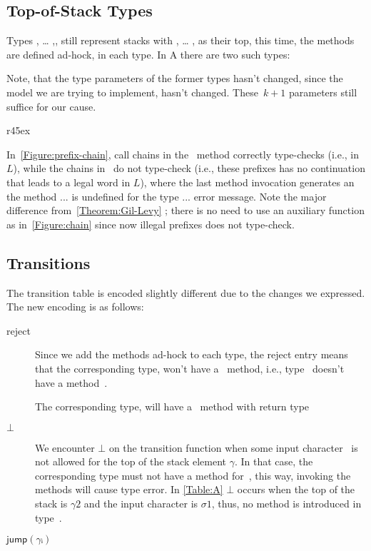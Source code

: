 \subsection{Top-of-Stack Types}
Types , … ,, still represent stacks
  with , … , as their top,
  this time, the methods are defined ad-hock, in each type.
In A there are two such types:

\begin{quote}
\end{quote}

Note, that the type parameters of the former types hasn't changed,
  since the model we are trying to implement, hasn't changed.
  These~$k+1$ parameters still suffice for our cause.

\begin{wrapfigure}[14]r{45ex}
  \caption{\label{Figure:prefix-chain} Accepting and non-accepting call chains with the
  type encoding of jDPDA~$A$ (as defined in \cref{Table:A}), such that 
  illegal prefixes won't compile}
\end{wrapfigure}

In~\cref{Figure:prefix-chain}, call chains in the~ method 
  correctly type-checks (i.e., in $L$), while the chains in~ 
  do not type-check (i.e., these prefixes has no continuation that leads to a legal word in $L$), 
  where the last method invocation generates an \textsf{the method ... is undefined for the type ...}
  error message.
Note the major difference from~\cref{Theorem:Gil-Levy} ; there is no need to
  use an auxiliary function  as in~\cref{Figure:chain} since now illegal
  prefixes does not type-check.
  
\subsection{Transitions}
The transition table is encoded slightly different due to the changes we expressed.
The new encoding is as follows:
\begin{description}
 \item[\textsf{reject}] Since we add the methods ad-hock to each type, the reject entry means 
   that the corresponding type, won't have a~\cc{\$()} method, i.e., type~
   doesn't have a method~\cc{\$()}.
 \item[\textsf{accept] The corresponding type, will have a~\cc{\$()} method with return type~
 \item[$\bot$] We encounter $\bot$ on the transition function when some input character~\cc{$\sigma$} 
   is not allowed for the top of the stack element $\gamma$. In that case, the corresponding type  
   must not have a method for~\cc{$\sigma$}, this way, invoking the methods will cause type error.
   In \cref{Table:A} $\bot$ occurs when the top of the stack is $\gamma{}2$ and the input character is $\sigma{}1$,
   thus, no method  is introduced in type~.
 \item[$\textsf{jump}(γᵢ)$]
  
\end{description}